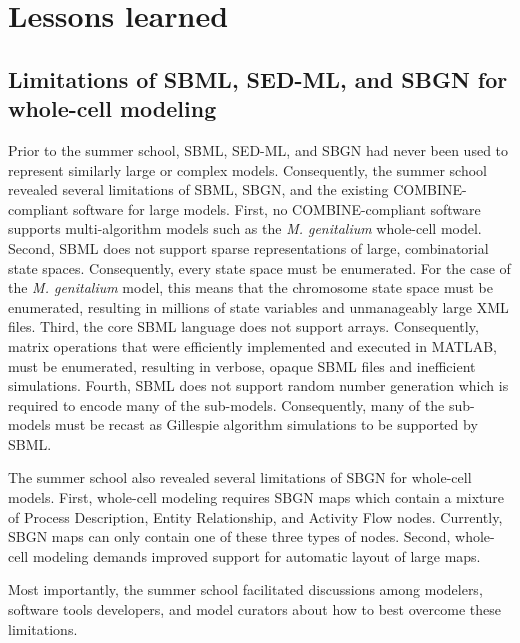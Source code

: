 \documentclass[journal,transmag]{IEEEtran}
\begin{document}
\section{Lessons learned}

\subsection{Limitations of SBML, SED-ML, and SBGN for whole-cell modeling}
Prior to the summer school, SBML, SED-ML, and SBGN had never been used to represent similarly large or complex models. 
Consequently, the summer school revealed several limitations of SBML, SBGN, and the existing COMBINE-compliant software for large models.
First, no COMBINE-compliant software supports multi-algorithm models such as the \textit{M. genitalium} whole-cell model. 
Second, SBML does not support sparse representations of large, combinatorial state spaces. Consequently, every state space must be enumerated. For the case of the \textit{M. genitalium} model, this means that the chromosome state space must be enumerated, resulting in millions of state variables and unmanageably large XML files.
Third, the core SBML language does not support arrays. Consequently, matrix operations that were efficiently implemented and executed in MATLAB, must be enumerated, resulting in verbose, opaque SBML files and inefficient simulations.
Fourth, SBML does not support random number generation which is required to encode many of the sub-models. Consequently, many of the sub-models must be recast as Gillespie algorithm simulations to be supported by SBML.

The summer school also revealed several limitations of SBGN for whole-cell models. 
First, whole-cell modeling requires SBGN maps which contain a mixture of Process Description, Entity Relationship, and Activity Flow nodes. Currently, SBGN maps can only contain one of these three types of nodes.
Second, whole-cell modeling demands improved support for automatic layout of large maps.

Most importantly, the summer school facilitated discussions among modelers, software tools developers, and model curators about how to best overcome these limitations.
\end{document}
